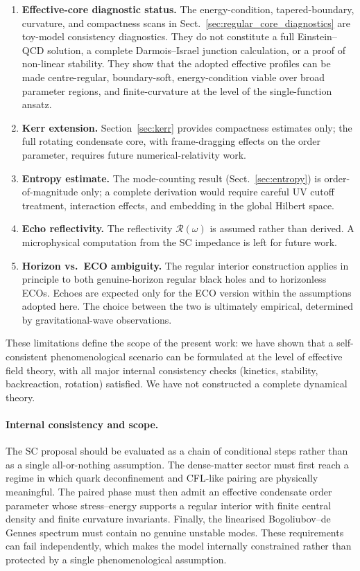 \documentclass[epj]{svjour}
\begin{document}
\begin{enumerate}
\item \textbf{Effective-core diagnostic status.} The energy-condition, tapered-boundary, curvature, and compactness scans in Sect.~\ref{sec:regular_core_diagnostics} are toy-model consistency diagnostics. They do not constitute a full Einstein--QCD solution, a complete Darmois--Israel junction calculation, or a proof of non-linear stability. They show that the adopted effective profiles can be made centre-regular, boundary-soft, energy-condition viable over broad parameter regions, and finite-curvature at the level of the single-function ansatz.

\item \textbf{Kerr extension.} Section~\ref{sec:kerr} provides compactness estimates only; the full rotating condensate core, with frame-dragging effects on the order parameter, requires future numerical-relativity work.

\item \textbf{Entropy estimate.} The mode-counting result (Sect.~\ref{sec:entropy}) is order-of-magnitude only; a complete derivation would require careful UV cutoff treatment, interaction effects, and embedding in the global Hilbert space.

\item \textbf{Echo reflectivity.} The reflectivity $\mathcal{R}(\omega)$ is assumed rather than derived. A microphysical computation from the SC impedance is left for future work.

\item \textbf{Horizon vs.\ ECO ambiguity.} The regular interior construction applies in principle to both genuine-horizon regular black holes and to horizonless ECOs. Echoes are expected only for the ECO version within the assumptions adopted here. The choice between the two is ultimately empirical, determined by gravitational-wave observations.
\end{enumerate}

These limitations define the scope of the present work: we have shown that a self-consistent phenomenological scenario can be formulated at the level of effective field theory, with all major internal consistency checks (kinetics, stability, backreaction, rotation) satisfied. We have not constructed a complete dynamical theory.

\paragraph{Internal consistency and scope.}
The SC proposal should be evaluated as a chain of conditional steps rather
than as a single all-or-nothing assumption. The dense-matter sector must first
reach a regime in which quark deconfinement and CFL-like pairing are physically
meaningful. The paired phase must then admit an effective condensate order
parameter whose stress--energy supports a regular interior with finite central
density and finite curvature invariants. Finally, the linearised
Bogoliubov--de Gennes spectrum must contain no genuine unstable modes. These
requirements can fail independently, which makes the model internally
constrained rather than protected by a single phenomenological assumption.
\end{document}

